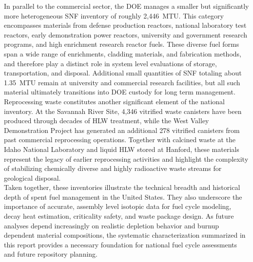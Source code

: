     In parallel to the commercial sector, the \gls{DOE} manages a smaller but significantly more heterogeneous \gls{SNF} inventory of
    roughly 2,446~MTU. This category encompasses materials from defense production reactors, national laboratory test reactors,
    early demonstration power reactors, university and government research programs, and high enrichment research reactor fuels.
    These diverse fuel forms span a wide range of enrichments, cladding materials, and fabrication methods, and therefore play a
    distinct role in system level evaluations of storage, transportation, and disposal. Additional small quantities of \gls{SNF} totaling
    about 1.35~MTU remain at university and commercial research facilities, but all such material ultimately transitions into \gls{DOE}
    custody for long term management.\\

    Reprocessing waste constitutes another significant element of the national inventory. At the Savannah River Site, 4,346 vitrified
    waste canisters have been produced through decades of \gls{HLW} treatment, while the West Valley Demonstration Project has
    generated an additional 278 vitrified canisters from past commercial reprocessing operations. Together with calcined waste at
    the Idaho National Laboratory and liquid \gls{HLW} stored at Hanford, these materials represent the legacy of earlier reprocessing
    activities and highlight the complexity of stabilizing chemically diverse and highly radioactive waste streams for geological
    disposal.\\

    Taken together, these inventories illustrate the technical breadth and historical depth of spent fuel management in the United
    States. They also underscore the importance of accurate, assembly level isotopic data for fuel cycle modeling, decay heat
    estimation, criticality safety, and waste package design. As future analyses depend increasingly on realistic depletion behavior
    and burnup dependent material compositions, the systematic characterization summarized in this report provides a necessary
    foundation for national fuel cycle assessments and future repository planning.


